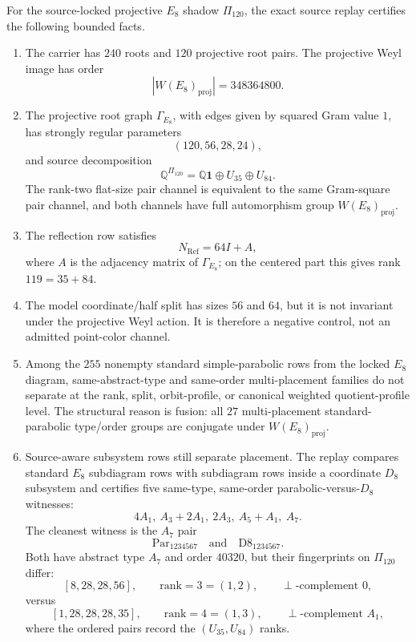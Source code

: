 \begin{proposition}
\label{prop:e8-root-shadow-subsystem-separator}
For the source-locked projective \(E_8\) shadow \(\Pi_{120}\), the exact source replay certifies the following bounded facts.
\begin{enumerate}[label=\textup{(\alph*)},leftmargin=*]
  \item The carrier has \(240\) roots and \(120\) projective root pairs.  The projective Weyl image has order
  \[
    |W(E_8)_{\mathrm{proj}}|=348364800.
  \]
  \item The projective root graph \(\Gamma_{E_8}\), with edges given by squared Gram value \(1\), has strongly regular parameters
  \[
    (120,56,28,24),
  \]
  and source decomposition
  \[
    \mathbb Q^{\Pi_{120}}=\mathbb Q\mathbf 1\oplus U_{35}\oplus U_{84}.
  \]
  The rank-two flat-size pair channel is equivalent to the same Gram-square pair channel, and both channels have full automorphism group \(W(E_8)_{\mathrm{proj}}\).
  \item The reflection row satisfies
  \[
    N_{\mathrm{Ref}}=64I+A,
  \]
  where \(A\) is the adjacency matrix of \(\Gamma_{E_8}\); on the centered part this gives rank \(119=35+84\).
  \item The model coordinate/half split has sizes \(56\) and \(64\), but it is not invariant under the projective Weyl action.  It is therefore a negative control, not an admitted point-color channel.
  \item Among the \(255\) nonempty standard simple-parabolic rows from the locked \(E_8\) diagram, same-abstract-type and same-order multi-placement families do not separate at the rank, split, orbit-profile, or canonical weighted quotient-profile level.  The structural reason is fusion: all \(27\) multi-placement standard-parabolic type/order groups are conjugate under \(W(E_8)_{\mathrm{proj}}\).
  \item Source-aware subsystem rows still separate placement.  The replay compares standard \(E_8\) subdiagram rows with subdiagram rows inside a coordinate \(D_8\) subsystem and certifies five same-type, same-order parabolic-versus-\(D_8\) witnesses:
  \[
    4A_1,\ A_3+2A_1,\ 2A_3,\ A_5+A_1,\ A_7.
  \]
  The cleanest witness is the \(A_7\) pair
  \[
    \mathrm{Par}_{1234567}
    \quad\text{and}\quad
    \mathrm{D8}_{1234567}.
  \]
  Both have abstract type \(A_7\) and order \(40320\), but their fingerprints on \(\Pi_{120}\) differ:
  \[
    [8,28,28,56],\qquad \mathrm{rank}=3=(1,2),\qquad \perp\text{-complement }0,
  \]
  versus
  \[
    [1,28,28,28,35],\qquad \mathrm{rank}=4=(1,3),\qquad \perp\text{-complement }A_1,
  \]
  where the ordered pairs record the \((U_{35},U_{84})\) ranks.
\end{enumerate}
\end{proposition}

